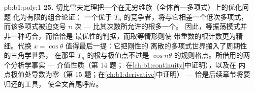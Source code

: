 \begin{solution}{pb:b1:poly:1}
\textbf{25.} 切比雪夫定理把一个在无穷维族（全体首一多项式）上的优化问题
化为有限的组合论证：
一个优于 $\widetilde T_n$ 的竞争者，将与它相差一个低次多项式，
而该多项式被迫变号
$n$ 次 --- 比其次数所允许的根多一个。
因此，等振荡模式并非一种巧合，而恰恰是
最优性的判据，而取等情形则使
带重数的根计数更为精细。代换 $x =
\cos\theta$ 值得最后一提：它把刚性的
离散的多项式世界搬入了周期性的三角学世界，
在那里 $T_n$ 的根与极值点不过是
$\cos n\theta$ 的规则格点。所借用的两个分析学事实
--- 介值性质（第 14 题；
在\cref{ch:b1:continuity}中证明），以及在
内点极值处导数为零（第 15 题；在\cref{ch:b1:derivative}中证明）
--- 恰是后续章节将要归还的工具，
使全文首尾呼应。
\end{solution}
